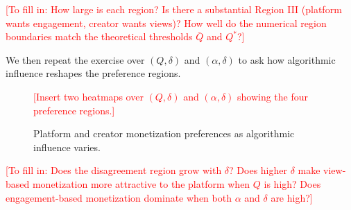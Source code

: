 \textcolor{red}{[To fill in: How large is each region? Is there a
substantial Region III (platform wants engagement, creator wants
views)? How well do the numerical region boundaries match the
theoretical thresholds $\bar Q$ and $Q^*$?]}

We then repeat the exercise over $(Q,\delta)$ and $(\alpha,\delta)$ to
ask how algorithmic influence reshapes the preference regions.

\begin{figure}[ht]
\centering
\textcolor{red}{[Insert two heatmaps over $(Q,\delta)$ and
$(\alpha,\delta)$ showing the four preference regions.]}
\caption{Platform and creator monetization preferences as algorithmic
influence varies.}
\label{fig:preference-map-delta}
\end{figure}

\textcolor{red}{[To fill in: Does the disagreement region grow with
$\delta$? Does higher $\delta$ make view-based monetization more
attractive to the platform when $Q$ is high? Does engagement-based
monetization dominate when both $\alpha$ and $\delta$ are high?]}
